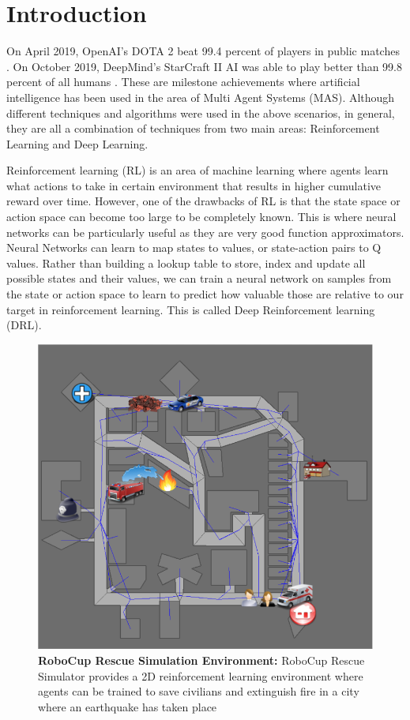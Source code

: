 \documentclass[12pt]{report}
\begin{document}
\chapter{Introduction}            


On April 2019, OpenAI's DOTA 2 beat 99.4 percent of players in public matches \cite{dota2}. On October 2019, DeepMind's StarCraft II AI was able to play better than 99.8 percent of all humans \cite{Starcraft2}. These are milestone achievements where artificial intelligence has been used in the area of Multi Agent Systems (MAS). Although different techniques and algorithms were used in the above scenarios, in general, they are all a combination of techniques from two main areas: Reinforcement Learning and Deep Learning. 

Reinforcement learning (RL) is an area of machine learning where agents learn what actions to take in certain environment that results in higher cumulative reward over time. However, one of the drawbacks of RL is that the state space or action space can become too large to be completely known. This is where neural networks can be particularly useful as they are very good function approximators. Neural Networks can learn to map states to values, or state-action pairs to Q values. Rather than building a lookup table to store, index and update all possible states and their values, we can train a neural network on samples from the state or action space to learn to predict how valuable those are relative to our target in reinforcement learning. This is called Deep Reinforcement learning (DRL). 

\begin{figure}[!h]
    \centering
    \includegraphics[width=12cm]{10.png}
    \caption{\textbf{RoboCup Rescue Simulation Environment:} RoboCup Rescue Simulator provides a 2D reinforcement learning environment where agents can be trained to save civilians and extinguish fire in a city where an earthquake has taken place}
    \label{fig:10}
\end{figure}
\end{document}
